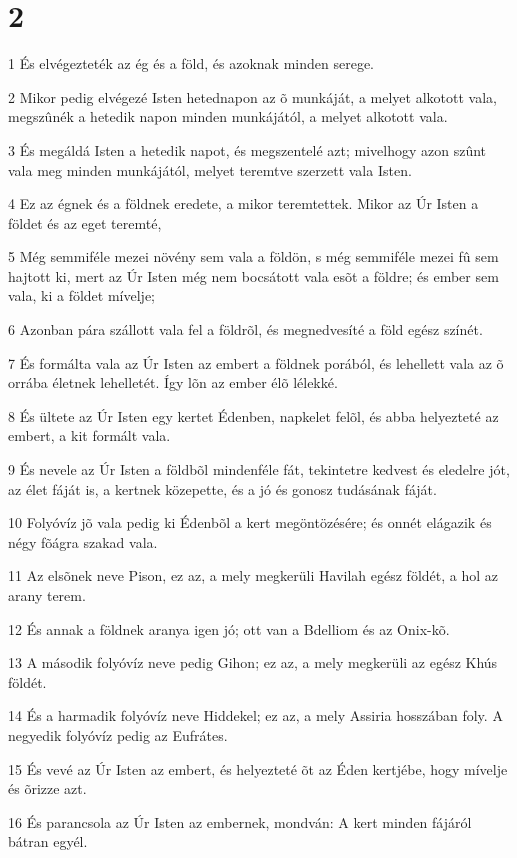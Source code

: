 \chapter{2}

\par 1 És elvégezteték az ég és a föld, és azoknak minden serege.
\par 2 Mikor pedig elvégezé Isten hetednapon az õ munkáját, a melyet alkotott vala, megszûnék a hetedik napon minden munkájától, a melyet alkotott vala.
\par 3 És megáldá Isten a hetedik napot, és megszentelé azt; mivelhogy azon szûnt vala meg minden munkájától, melyet teremtve szerzett vala Isten.
\par 4 Ez az égnek és a földnek eredete, a mikor teremtettek. Mikor az Úr Isten a földet és az eget teremté,
\par 5 Még semmiféle mezei növény sem vala a földön, s még semmiféle mezei fû sem hajtott ki, mert az Úr Isten még nem bocsátott vala esõt a földre; és ember sem vala, ki a földet mívelje;
\par 6 Azonban pára szállott vala fel a földrõl, és megnedvesíté a föld egész színét.
\par 7 És formálta vala az Úr Isten az embert a földnek porából, és lehellett vala az õ orrába életnek lehelletét. Így lõn az ember élõ lélekké.
\par 8 És ültete az Úr Isten egy kertet Édenben, napkelet felõl, és abba helyezteté az embert, a kit formált vala.
\par 9 És nevele az Úr Isten a földbõl mindenféle fát, tekintetre kedvest és eledelre jót, az élet fáját is, a kertnek közepette, és a jó és gonosz tudásának fáját.
\par 10 Folyóvíz jõ vala pedig ki Édenbõl a kert megöntözésére; és onnét elágazik és négy fõágra szakad vala.
\par 11 Az elsõnek neve Pison, ez az, a mely megkerüli Havilah egész földét, a hol az arany terem.
\par 12 És annak a földnek aranya igen jó; ott van a Bdelliom és az Onix-kõ.
\par 13 A második folyóvíz neve pedig Gihon; ez az, a mely megkerüli az egész Khús földét.
\par 14 És a harmadik folyóvíz neve Hiddekel; ez az, a mely Assiria hosszában foly. A negyedik folyóvíz pedig az Eufrátes.
\par 15 És vevé az Úr Isten az embert, és helyezteté õt az Éden kertjébe, hogy mívelje és õrizze azt.
\par 16 És parancsola az Úr Isten az embernek, mondván: A kert minden fájáról bátran egyél.
